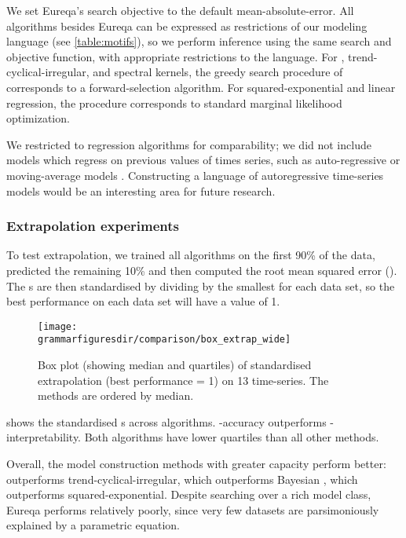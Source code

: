 We set Eureqa's search objective to the default mean-absolute-error.
All algorithms besides Eureqa can be expressed as restrictions of our modeling language (see \cref{table:motifs}), so we perform inference using the same search and objective function, with appropriate restrictions to the language.
For \MKL{}, trend-cyclical-irregular, and spectral kernels, the greedy search procedure of \procedurename{} corresponds to a forward-selection algorithm.
For squared-exponential and linear regression, the procedure corresponds to standard marginal likelihood optimization.

We restricted to regression algorithms for comparability; we did not include models which regress on previous values of times series, such as auto-regressive or moving-average models \citep[e.g.][]{box2013time}.
Constructing a language of autoregressive time-series models would be an interesting area for future research.



\subsubsection{Extrapolation experiments}

To test extrapolation, we trained all algorithms on the first 90\% of the data, predicted the remaining 10\% and then computed the root mean squared error (\RMSE{}).
The \RMSE{}s are then standardised by dividing by the smallest \RMSE{} for each data set, so the best performance on each data set will have a value of 1.

\begin{figure}[h!]
\texttt{[image: \\grammarfiguresdir/comparison/box\_extrap\_wide]}
\caption[Extrapolation error of all methods on 13 time-series datasets]
{Box plot (showing median and quartiles) of standardised extrapolation \RMSE{} (best performance = 1) on 13 time-series.
The methods are ordered by median.
}
\label{fig:box_extrap_dist}
\end{figure}


 shows the standardised \RMSE{}s across algorithms.
\procedurename{}-accuracy outperforms \procedurename{}-interpretability.
Both algorithms have lower quartiles than all other methods.

Overall, the model construction methods with greater capacity perform better: \procedurename{} outperforms trend-cyclical-irregular, which outperforms Bayesian \MKL{}, which outperforms squared-exponential.
Despite searching over a rich model class, Eureqa performs relatively poorly, since very few datasets are parsimoniously explained by a parametric equation.

